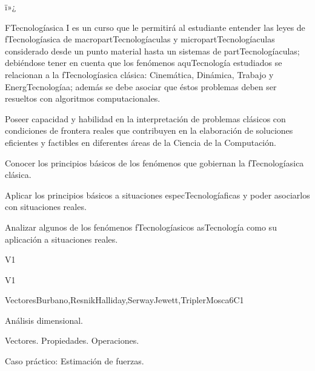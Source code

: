 ï»¿\begin{syllabus}


\begin{justification}
FTecnologíasica I es un curso que le permitirá al estudiante entender
las leyes de fTecnologíasica de macropartTecnologíaculas y micropartTecnologíaculas considerado desde un
punto material hasta un sistemas de partTecnologíaculas; debiéndose tener en cuenta que los
fenómenos aquTecnología estudiados se relacionan a la fTecnologíasica clásica: Cinemática, Dinámica, Trabajo y EnergTecnologíaa; 
además se debe asociar que éstos problemas deben ser resueltos con algoritmos computacionales.

Poseer capacidad y habilidad en la interpretación de problemas clásicos
con condiciones de frontera reales que contribuyen en la elaboración de soluciones eficientes
y factibles en diferentes áreas de la Ciencia de la Computación.
\end{justification}

\begin{goals}
\item Conocer los principios básicos de los fenómenos que gobiernan la fTecnologíasica clásica.
\item Aplicar los principios básicos a situaciones especTecnologíaficas y poder asociarlos con situaciones reales.
\item Analizar algunos de los fenómenos fTecnologíasicos asTecnología como su aplicación a situaciones reales.
\end{goals}

\begin{outcomes}{V1}
  \item {}
  \item {}
  \item {}
\end{outcomes}

\begin{competences}{V1}
  \item {} 
  \item {}
  \item {}
\end{competences}

\begin{unit}{Vectores}{}{Burbano,ResnikHalliday,SerwayJewett,TriplerMosca}{6}{C1}
\begin{topics}
      \item Análisis dimensional.
      \item Vectores. Propiedades. Operaciones.
      \item Caso práctico: Estimación de fuerzas.
   \end{topics}


\end{unit}
\end{syllabus}
